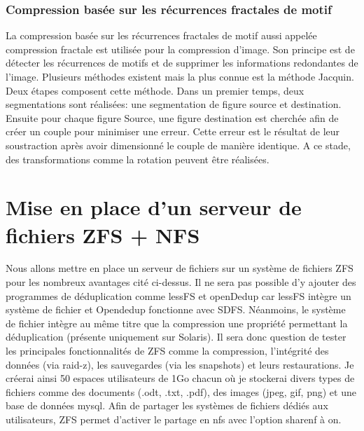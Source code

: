\documentclass[a4paper]{report}
\begin{document}
	\subsection{Compression basée sur les récurrences fractales de motif}
		La compression basée sur les récurrences fractales de motif aussi appelée compression fractale est utilisée pour la compression d'image. Son principe est de détecter les récurrences de motifs et de supprimer les informations redondantes de l'image. Plusieurs méthodes existent mais la plus connue est la méthode Jacquin. Deux étapes composent cette méthode. Dans un premier temps, deux segmentations sont réalisées: une segmentation de figure source et destination. Ensuite pour chaque figure Source, une figure destination est cherchée afin de créer un couple pour minimiser une erreur. Cette erreur est le résultat de leur soustraction après avoir dimensionné le couple de manière identique. A ce stade, des transformations comme la rotation peuvent être réalisées.
		
         \chapter{Mise en place d'un serveur de fichiers ZFS + NFS}
		Nous allons mettre en place un serveur de fichiers sur un système de fichiers ZFS pour les nombreux avantages cité ci-dessus. Il ne sera pas possible d'y ajouter des programmes de déduplication comme lessFS et openDedup car lessFS intègre un système de fichier et Opendedup fonctionne avec SDFS. Néanmoins, le système de fichier intègre au même titre que la compression une propriété permettant la déduplication (présente uniquement sur Solaris). Il sera donc question de tester les principales fonctionnalités de ZFS comme la compression, l'intégrité des données (via raid-z), les sauvegardes (via les snapshots) et leurs restaurations. Je créerai ainsi 50 espaces utilisateurs de 1Go chacun où je stockerai divers types de fichiers comme des documents (.odt, .txt, .pdf), des images (jpeg, gif, png) et une base de données mysql. Afin de partager les systèmes de fichiers dédiés aux utilisateurs, ZFS permet d'activer le partage en nfs avec l'option sharenf à on.
\end{document}
